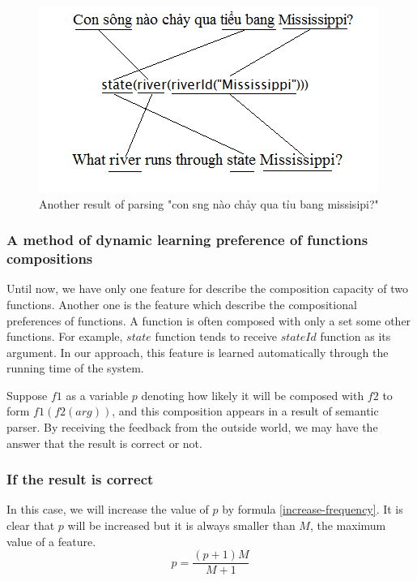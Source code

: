 \begin{figure}[ht!]
\centering
\includegraphics[scale=0.7]{eg-function-function-mapping2.png}
\caption{Another result of parsing "{\selectfont con s\ocircumflex ng n\`ao ch\h{a}y qua ti\h\ecircumflex u bang missisipi?}"}
\label{f-f.eg2}
\end{figure}

\subsubsection{A method of dynamic learning preference of functions compositions}
Until now, we have only one feature for describe the composition capacity of two functions. Another one is the feature which describe the compositional preferences of functions. A function is often composed with only a set some other functions. For example, $state$ function tends to receive $stateId$ function as its argument. In our approach, this feature is learned automatically through the running time of the system. 

Suppose $f1$ as a variable $p$ denoting how likely it will be composed with $f2$ to form $f1(f2(arg))$, and this composition appears in a result of semantic parser. By receiving the feedback from the outside world, we may have the answer that the result is correct or not.
\subsubsection*{If the result is correct}
In this case, we will increase the value of $p$ by formula \ref{increase-frequency}. It is clear that $p$ will be increased but it is always smaller than $M$, the maximum value of a feature.
\begin{equation}
\label{increase-frequency}
p = \frac{(p + 1)M}{M+1}
\end{equation}

